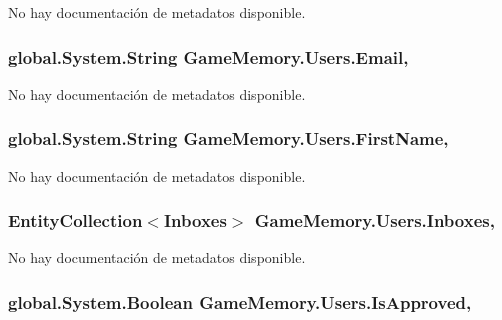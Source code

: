 No hay documentación de metadatos disponible. 

\hypertarget{class_game_memory_1_1_users_aae427c5afcfec36bc3e06a306b631ca3}{
\subsubsection[{Email}]{\setlength{\rightskip}{0pt plus 5cm}global.\-System.\-String Game\-Memory.\-Users.\-Email\hspace{0.3cm}{\ttfamily [get]}, {\ttfamily [set]}}}\label{class_game_memory_1_1_users_aae427c5afcfec36bc3e06a306b631ca3}


No hay documentación de metadatos disponible. 

\hypertarget{class_game_memory_1_1_users_af6e34812d5ef60563a0566e65bbe5e6b}{
\subsubsection[{First\-Name}]{\setlength{\rightskip}{0pt plus 5cm}global.\-System.\-String Game\-Memory.\-Users.\-First\-Name\hspace{0.3cm}{\ttfamily [get]}, {\ttfamily [set]}}}\label{class_game_memory_1_1_users_af6e34812d5ef60563a0566e65bbe5e6b}


No hay documentación de metadatos disponible. 

\hypertarget{class_game_memory_1_1_users_a612925fd6d50f8624a9067e930bcbe37}{
\subsubsection[{Inboxes}]{\setlength{\rightskip}{0pt plus 5cm}Entity\-Collection$<${\bf Inboxes}$>$ Game\-Memory.\-Users.\-Inboxes\hspace{0.3cm}{\ttfamily [get]}, {\ttfamily [set]}}}\label{class_game_memory_1_1_users_a612925fd6d50f8624a9067e930bcbe37}


No hay documentación de metadatos disponible. 

\hypertarget{class_game_memory_1_1_users_a112ee494edcaeda109a5ea967b60273c}{
\subsubsection[{Is\-Approved}]{\setlength{\rightskip}{0pt plus 5cm}global.\-System.\-Boolean Game\-Memory.\-Users.\-Is\-Approved\hspace{0.3cm}{\ttfamily [get]}, {\ttfamily [set]}}}\label{class_game_memory_1_1_users_a112ee494edcaeda109a5ea967b60273c}


